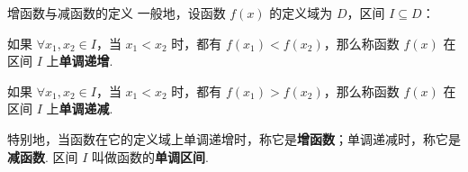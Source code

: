 \documentclass[aspectratio=169,13pt,t] {beamer}
\theoremstyle{definition}
\begin{document}
\begin{frame}{增函数与减函数的定义}
	\pause
	一般地，设函数 \(f(x)\) 的定义域为 \(D\)，区间 \(I\subseteq D\)：
	\pause
	\begin{summarybox}[单调递增]
	如果 \(\forall x_1,x_2\in I\)，当 \(x_1<x_2\) 时，都有 \(f(x_1)<f(x_2)\)，那么称函数 \(f(x)\) 在区间 \(I\) 上\textbf{单调递增}.
	\end{summarybox}
	\pause
	\begin{summarybox}[单调递减]
	如果 \(\forall x_1,x_2\in I\)，当 \(x_1<x_2\) 时，都有 \(f(x_1)>f(x_2)\)，那么称函数 \(f(x)\) 在区间 \(I\) 上\textbf{单调递减}.
	\end{summarybox}
	\vspace{0.5em}
	\pause
	\begin{summarybox-answer}
	特别地，当函数在它的定义域上单调递增时，称它是\textbf{增函数}；单调递减时，称它是\textbf{减函数}. 区间 \(I\) 叫做函数的\textbf{单调区间}.
	\end{summarybox-answer}
\end{frame}
\end{document}
